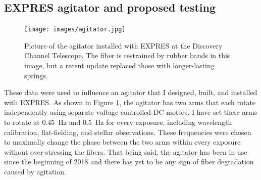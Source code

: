 \documentclass[11pt]{article}
\begin{document}
\subsection{EXPRES agitator and proposed testing}
\label{subsec:modal_noise_testing}

\begin{figure}
    \centering
    \texttt{[image: images/agitator.jpg]}
    \caption{Picture of the agitator installed with EXPRES at the Discovery Channel Telescope. The fiber is restrained by rubber bands in this image, but a recent update replaced those with longer-lasting springs.}
    \label{fig:agitator}
\end{figure}

These data were used to influence an agitator that I designed, built, and installed with EXPRES. As shown in Figure \ref{fig:agitator}, the agitator has two arms that each rotate independently using separate voltage-controlled DC motors. I have set these arms to rotate at \SI{0.45}{\hertz} and \SI{0.5}{\hertz} for every exposure, including wavelength calibration, flat-fielding, and stellar observations. These frequencies were chosen to maximally change the phase between the two arms within every exposure without over-stressing the fibers. That being said, the agitator has been in use since the beginning of 2018 and there has yet to be any sign of fiber degradation caused by agitation.
\end{document}
